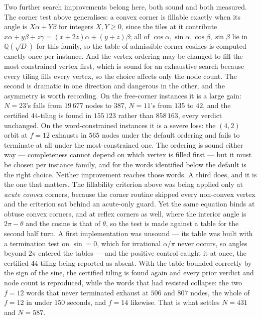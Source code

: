 \documentclass[11pt,reqno]{amsart}
\theoremstyle{plain}
\theoremstyle{definition}
\begin{document}
Two further search improvements belong here, both sound and both measured. The corner test above
generalises: a convex corner is fillable exactly when its angle is $X\alpha+Y\beta$ for integers
$X,Y\ge0$, since the tiles at it contribute $x\alpha+y\beta+z\gamma=(x{+}2z)\alpha+(y{+}z)\beta$;
all of $\cos\alpha,\sin\alpha,\cos\beta,\sin\beta$ lie in $\mathbb Q(\sqrt D)$ for this family, so
the table of admissible corner cosines is computed exactly once per instance. And the vertex
ordering may be changed to fill the most constrained vertex first, which is sound for an
exhaustive search because every tiling fills every vertex, so the choice affects only the node
count. The second is dramatic in one direction and dangerous in the other, and the asymmetry is worth
recording. On the free-corner instances it is a large gain: $N=23$'s falls from $19\,677$ nodes to
$387$, $N=11$'s from $135$ to $42$, and the certified $44$-tiling is found in $155\,123$ rather
than $858\,163$, every verdict unchanged. On the word-constrained instances it is a severe loss:
the $(4,2)$ orbit at $f=12$ exhausts in $565$ nodes under the default ordering and fails to
terminate at all under the most-constrained one. The ordering is sound either way --- completeness
cannot depend on which vertex is filled first --- but it must be chosen per instance family, and
for the words identified below the default is the right choice. Neither improvement reaches those
words. A third does, and it is the one that matters. The fillability criterion above was being
applied only at \emph{acute convex} corners, because the corner routine skipped every non-convex
vertex and the criterion sat behind an acute-only guard. Yet the same equation binds at obtuse
convex corners, and at reflex corners as well, where the interior angle is $2\pi-\theta$ and the
cosine is that of $\theta$, so the test is made against a table for the second half turn. A first
implementation was unsound --- its table was built with a termination test on $\sin=0$, which for
irrational $\alpha/\pi$ never occurs, so angles beyond $2\pi$ entered the tables --- and the
positive control caught it at once, the certified $44$-tiling being reported as absent. With the
table bounded correctly by the sign of the sine, the certified tiling is found again and every
prior verdict and node count is reproduced, while the words that had resisted collapse: the two
$f=12$ words that never terminated exhaust at $506$ and $807$ nodes, the whole of $f=12$ in under
$150$ seconds, and $f=14$ likewise. That is what settles $N=431$ and $N=587$.
\end{document}
